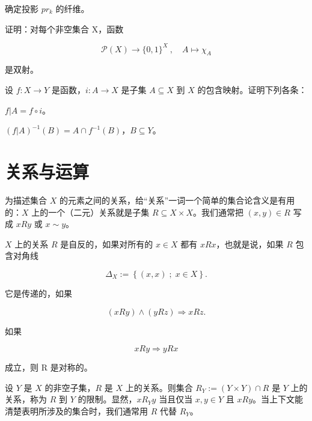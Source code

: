 \begin{exercises}
\begin{items}
\end{items}

\item

确定投影 $ pr_{k} $ 的纤维。

\item

证明：对每个非空集合 X，函数

\[
\mathcal{P}(X)\to\{0,1\}^{X}~,\quad A\mapsto\chi_{A}
\]

是双射。

\item

设 $f: X \to Y$ 是函数，$i: A \to X$ 是子集 $A \subseteq X$ 到 $X$ 的包含映射。证明下列各条：

\begin{items}
\item

$ f|A = f \circ i $。

\item

$ (f|A)^{-1}(B) = A \cap f^{-1}(B) $，$ B \subseteq Y $。

\end{items}

\end{exercises}

\section{关系与运算}

为描述集合 $X$ 的元素之间的关系，给“关系”一词一个简单的集合论含义是有用的：$X$ 上的一个（二元）关系就是子集 $R \subseteq X \times X$。我们通常把 $(x, y) \in R$ 写成 $xRy$ 或 $x \sim y$。

$X$ 上的关系 $R$ 是自反的，如果对所有的 $x \in X$ 都有 $xRx$，也就是说，如果 $R$ 包含对角线

\[
\Delta_{X}:=\left\{(x,x)\;;\;x\in X\right\}.
\]

它是传递的，如果

\[
(x R y)\land(y R z)\Rightarrow x R z.
\]

如果

\[
xR y \Rightarrow yRx
\]

成立，则 R 是对称的。

设 $Y$ 是 $X$ 的非空子集，$R$ 是 $X$ 上的关系。则集合 $R_Y := (Y \times Y) \cap R$ 是 $Y$ 上的关系，称为 $R$ 到 $Y$ 的限制。显然，$xR_Y y$ 当且仅当 $x, y \in Y$ 且 $xRy$。当上下文能清楚表明所涉及的集合时，我们通常用 $R$ 代替 $R_Y$。

